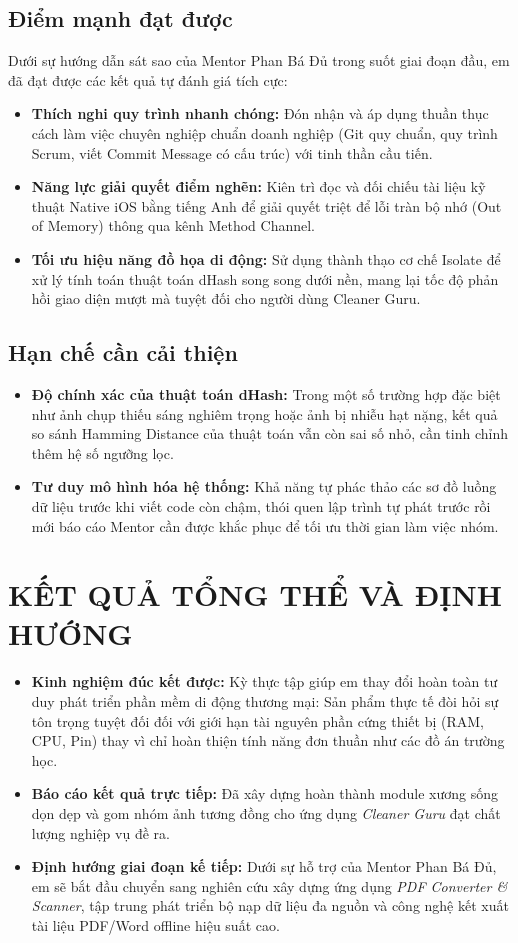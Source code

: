 \documentclass[12pt, a4paper]{article}
\begin{document}
\subsection{Điểm mạnh đạt được}
Dưới sự hướng dẫn sát sao của Mentor Phan Bá Đủ trong suốt giai đoạn đầu, em đã đạt được các kết quả tự đánh giá tích cực:
\begin{itemize}
    \item \textbf{Thích nghi quy trình nhanh chóng:} Đón nhận và áp dụng thuần thục cách làm việc chuyên nghiệp chuẩn doanh nghiệp (Git quy chuẩn, quy trình Scrum, viết Commit Message có cấu trúc) với tinh thần cầu tiến.
    \item \textbf{Năng lực giải quyết điểm nghẽn:} Kiên trì đọc và đối chiếu tài liệu kỹ thuật Native iOS bằng tiếng Anh để giải quyết triệt để lỗi tràn bộ nhớ (Out of Memory) thông qua kênh Method Channel.
    \item \textbf{Tối ưu hiệu năng đồ họa di động:} Sử dụng thành thạo cơ chế Isolate để xử lý tính toán thuật toán dHash song song dưới nền, mang lại tốc độ phản hồi giao diện mượt mà tuyệt đối cho người dùng Cleaner Guru.
\end{itemize}

\subsection{Hạn chế cần cải thiện}
\begin{itemize}
    \item \textbf{Độ chính xác của thuật toán dHash:} Trong một số trường hợp đặc biệt như ảnh chụp thiếu sáng nghiêm trọng hoặc ảnh bị nhiễu hạt nặng, kết quả so sánh Hamming Distance của thuật toán vẫn còn sai số nhỏ, cần tinh chỉnh thêm hệ số ngưỡng lọc.
    \item \textbf{Tư duy mô hình hóa hệ thống:} Khả năng tự phác thảo các sơ đồ luồng dữ liệu trước khi viết code còn chậm, thói quen lập trình tự phát trước rồi mới báo cáo Mentor cần được khắc phục để tối ưu thời gian làm việc nhóm.
\end{itemize}

\section{KẾT QUẢ TỔNG THỂ VÀ ĐỊNH HƯỚNG}
\begin{itemize}
    \item \textbf{Kinh nghiệm đúc kết được:} Kỳ thực tập giúp em thay đổi hoàn toàn tư duy phát triển phần mềm di động thương mại: Sản phẩm thực tế đòi hỏi sự tôn trọng tuyệt đối đối với giới hạn tài nguyên phần cứng thiết bị (RAM, CPU, Pin) thay vì chỉ hoàn thiện tính năng đơn thuần như các đồ án trường học.
    \item \textbf{Báo cáo kết quả trực tiếp:} Đã xây dựng hoàn thành module xương sống dọn dẹp và gom nhóm ảnh tương đồng cho ứng dụng \textit{Cleaner Guru} đạt chất lượng nghiệp vụ đề ra.
    \item \textbf{Định hướng giai đoạn kế tiếp:} Dưới sự hỗ trợ của Mentor Phan Bá Đủ, em sẽ bắt đầu chuyển sang nghiên cứu xây dựng ứng dụng \textit{PDF Converter \& Scanner}, tập trung phát triển bộ nạp dữ liệu đa nguồn và công nghệ kết xuất tài liệu PDF/Word offline hiệu suất cao.
\end{itemize}
\end{document}
